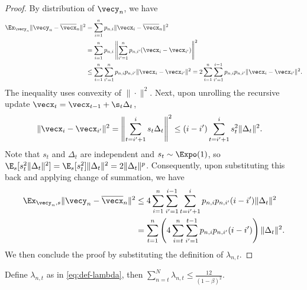 \begin{proof}
By distribution of $\vecy_n$, we have
\begin{align*}
    \Ex_{\vecy_n} \|\vecy_n - \overline\vecx_n\|^2 
    &= \sum_{i=1}^n p_{n,i} \|\vecx_i - \overline \vecx_n\|^2 \\
    &= \sum_{i=1}^n p_{n,i} \left\| \sum_{i'=1}^n p_{n,i'}(\vecx_i-\vecx_{i'}) \right\|^2 \\
    &\le \sum_{i=1}^n\sum_{i'=1}^n p_{n,i}p_{n,i'} \|\vecx_i-\vecx_{i'}\|^2 
    = 2\sum_{i=1}^n\sum_{i'=1}^{i-1} p_{n,i}p_{n,i'}\|\vecx_i-\vecx_{i'}\|^2.
\end{align*}
The inequality uses convexity of $\|\cdot\|^2$. Next, upon unrolling the recursive update $\vecx_t = \vecx_{t-1} + \s_t\Delta_t$,
\begin{align*}
    \|\vecx_i-\vecx_{i'}\|^2
    &= \left\| \sum_{t=i'+1}^i s_t\Delta_t\right\|^2 
    \le (i-i') \sum_{t=i'+1}^i s_t^2\|\Delta_t\|^2.
\end{align*}
Note that $s_t$ and $\Delta_t$ are independent and $s_t\sim \Expo(1)$, so $\E_s[s_t^2\|\Delta_t\|^2] = \E_s[s_t^2] \|\Delta_t\|^2 = 2\|\Delta_t\|^p$. Consequently, upon substituting this back and applying change of summation, we have
\begin{align*}
    \Ex_{\vecy_n,s} \|\vecy_n-\overline\vecx_n\|^2 
    &\le 4\sum_{i=1}^n\sum_{i'=1}^{i-1}\sum_{t=i'+1}^i p_{n,i}p_{n,i'}(i-i') \|\Delta_t\|^2 \\
    &= \sum_{t=1}^n \left(4\sum_{i=t}^n\sum_{i'=1}^{t-1}p_{n,i}p_{n,i'}(i-i')\right) \|\Delta_t\|^2.
\end{align*}
We then conclude the proof by substituting the definition of $\lambda_{n,t}$.
\end{proof}


\begin{proposition}
\label{prop:tech-lam-t:N}
Define $\lambda_{n,t}$ as in \eqref{eq:def-lambda}, then $\sum_{n=t}^N \lambda_{n,t} \le \frac{12}{(1-\beta)^2}$.
\end{proposition}


